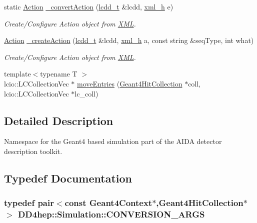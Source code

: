 \begin{DoxyCompactItemize}
static \hyperlink{class_d_d4hep_1_1_simulation_1_1_geant4_handle}{Action} \hyperlink{namespace_d_d4hep_1_1_simulation_a4a3e1d80b410fdc413e130d69c311891}{\_\-convertAction} (\hyperlink{class_d_d4hep_1_1_geometry_1_1_l_c_d_d}{lcdd\_\-t} \&lcdd, \hyperlink{class_d_d4hep_1_1_x_m_l_1_1_handle__t}{xml\_\-h} e)
\begin{DoxyCompactList}\small\item\em Create/Configure Action object from \hyperlink{namespace_d_d4hep_1_1_x_m_l}{XML}. \item\end{DoxyCompactList}\item 
\hyperlink{class_d_d4hep_1_1_simulation_1_1_geant4_handle}{Action} \hyperlink{namespace_d_d4hep_1_1_simulation_a21f9fcaa27a71abd2beeabcba2600bda}{\_\-createAction} (\hyperlink{class_d_d4hep_1_1_geometry_1_1_l_c_d_d}{lcdd\_\-t} \&lcdd, \hyperlink{class_d_d4hep_1_1_x_m_l_1_1_handle__t}{xml\_\-h} a, const string \&seqType, int what)
\begin{DoxyCompactList}\small\item\em Create/Configure Action object from \hyperlink{namespace_d_d4hep_1_1_x_m_l}{XML}. \item\end{DoxyCompactList}\item 
{\footnotesize template$<$typename T $>$ }\\lcio::LCCollectionVec $\ast$ \hyperlink{namespace_d_d4hep_1_1_simulation_a93ffa3fab19c389039276ed3576e8c55}{moveEntries} (\hyperlink{class_d_d4hep_1_1_simulation_1_1_geant4_hit_collection}{Geant4HitCollection} $\ast$coll, lcio::LCCollectionVec $\ast$lc\_\-coll)
\end{DoxyCompactItemize}


\subsection{Detailed Description}
Namespace for the Geant4 based simulation part of the AIDA detector description toolkit. 

\subsection{Typedef Documentation}
\hypertarget{namespace_d_d4hep_1_1_simulation_a8700b6db44e003d9cf53ec35933063dc}{
\subsubsection[{CONVERSION\_\-ARGS}]{\setlength{\rightskip}{0pt plus 5cm}typedef {\bf pair}$<$const {\bf Geant4Context}$\ast$,{\bf Geant4HitCollection}$\ast$$>$ {\bf DD4hep::Simulation::CONVERSION\_\-ARGS}}}
\label{namespace_d_d4hep_1_1_simulation_a8700b6db44e003d9cf53ec35933063dc}


